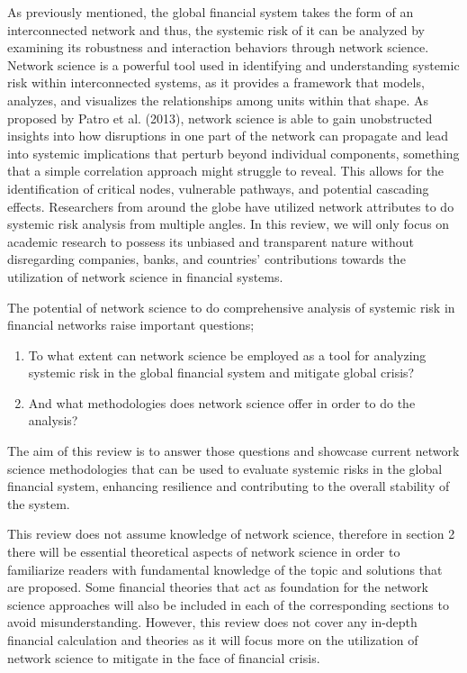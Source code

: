 \documentclass[a4paper,11pt]{article}
\begin{document}
As previously mentioned, the global financial system takes the form of an interconnected network and thus, the systemic risk of it can be analyzed by examining its robustness and interaction behaviors through network science. Network science is a powerful tool used in identifying and understanding systemic risk within interconnected systems, as it provides a framework that models, analyzes, and visualizes the relationships among units within that shape. As proposed by Patro et al. (2013), network science is able to gain unobstructed insights into how disruptions in one part of the network can propagate and lead into systemic implications that perturb beyond individual components, something that a simple correlation approach might struggle to reveal. This allows for the identification of critical nodes, vulnerable pathways, and potential cascading effects. Researchers from around the globe have utilized network attributes to do systemic risk analysis from multiple angles. In this review, we will only focus on academic research  to possess  its unbiased and transparent nature without disregarding companies, banks, and countries’ contributions towards the utilization of network science in financial systems.

The potential of network science to do comprehensive analysis of systemic risk in financial networks raise important questions;
\begin{enumerate}
    \item To what extent can network science be employed as a tool for analyzing systemic risk in the global financial system and mitigate global crisis? 
    \item And what methodologies does network science offer in order to do the analysis? 
\end{enumerate}
The aim of this review is to answer those questions and showcase current network science methodologies that can be used to evaluate systemic risks in the global financial system, enhancing resilience and contributing to the overall stability of the system.

This review does not assume knowledge of network science, therefore in section 2 there will be essential theoretical aspects of network science in order to familiarize readers with fundamental knowledge of the topic and solutions that are proposed. Some financial theories that act as foundation for the network science approaches will also be included in each of the corresponding sections to avoid misunderstanding. However, this review does not cover any in-depth financial calculation and theories as it will focus more on the utilization of network science to mitigate in the face of financial crisis.
\end{document}
